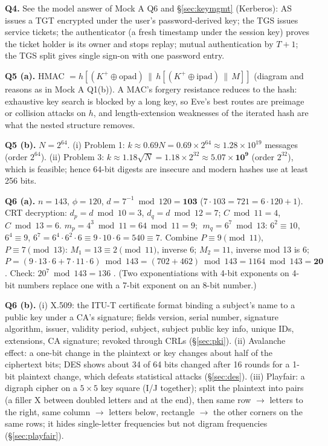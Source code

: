\textbf{Q4.} See the model answer of Mock A Q6 and \S\ref{sec:keymgmt} (Kerberos): AS issues a TGT encrypted under the user's password-derived key; the TGS issues service tickets; the authenticator (a fresh timestamp under the session key) proves the ticket holder is its owner and stops replay; mutual authentication by $T + 1$; the TGS split gives single sign-on with one password entry.

\textbf{Q5 (a).} HMAC $= h[(K^+ \oplus \text{opad}) \,\|\, h[(K^+ \oplus \text{ipad}) \,\|\, M]]$ (diagram and reasons as in Mock A Q1(b)). A MAC's forgery resistance reduces to the hash: exhaustive key search is blocked by a long key, so Eve's best routes are preimage or collision attacks on $h$, and length-extension weaknesses of the iterated hash are what the nested structure removes.

\textbf{Q5 (b).} $N = 2^{64}$. (i) Problem 1: $k \approx 0.69N = 0.69 \times 2^{64} \approx 1.28 \times 10^{19}$ messages (order $2^{64}$). (ii) Problem 3: $k \approx 1.18\sqrt N = 1.18 \times 2^{32} \approx \mathbf{5.07 \times 10^9}$ (order $2^{32}$), which is feasible; hence 64-bit digests are insecure and modern hashes use at least 256 bits.

\textbf{Q6 (a).} $n = 143$, $\phi = 120$, $d = 7^{-1} \bmod 120 = \mathbf{103}$ ($7 \cdot 103 = 721 = 6 \cdot 120 + 1$). CRT decryption: $d_p = d \bmod 10 = 3$, $d_q = d \bmod 12 = 7$; $C \bmod 11 = 4$, $C \bmod 13 = 6$.
$m_p = 4^3 \bmod 11 = 64 \bmod 11 = 9$; $\;m_q = 6^7 \bmod 13$: $6^2 \equiv 10$, $6^4 \equiv 9$, $6^7 = 6^4 \cdot 6^2 \cdot 6 \equiv 9 \cdot 10 \cdot 6 = 540 \equiv 7$.
Combine $P \equiv 9 \pmod{11}$, $P \equiv 7 \pmod{13}$: $M_1 = 13 \equiv 2 \pmod{11}$, inverse 6; $M_2 = 11$, inverse mod 13 is 6; $P = (9 \cdot 13 \cdot 6 + 7 \cdot 11 \cdot 6) \bmod 143 = (702 + 462) \bmod 143 = 1164 \bmod 143 = \mathbf{20}$. Check: $20^7 \bmod 143 = 136$ \checkmark. (Two exponentiations with 4-bit exponents on 4-bit numbers replace one with a 7-bit exponent on an 8-bit number.)

\textbf{Q6 (b).} (i) X.509: the ITU-T certificate format binding a subject's name to a public key under a CA's signature; fields version, serial number, signature algorithm, issuer, validity period, subject, subject public key info, unique IDs, extensions, CA signature; revoked through CRLs (\S\ref{sec:pki}). (ii) Avalanche effect: a one-bit change in the plaintext or key changes about half of the ciphertext bits; DES shows about 34 of 64 bits changed after 16 rounds for a 1-bit plaintext change, which defeats statistical attacks (\S\ref{sec:des}). (iii) Playfair: a digraph cipher on a $5 \times 5$ key square (I/J together); split the plaintext into pairs (a filler X between doubled letters and at the end), then same row $\to$ letters to the right, same column $\to$ letters below, rectangle $\to$ the other corners on the same rows; it hides single-letter frequencies but not digram frequencies (\S\ref{sec:playfair}).
